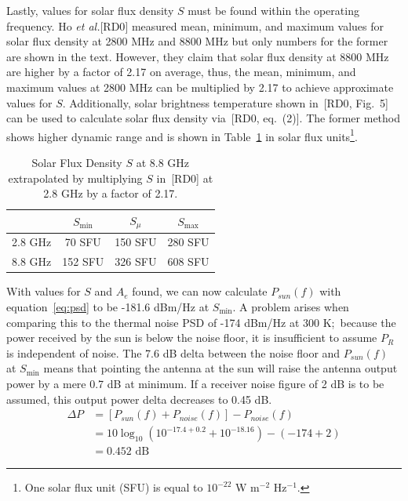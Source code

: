 \documentclass[titlepage]{article}
\newcommand{\nraocite}[1]{[RD0\cite{#1}]}
\newcommand{\nraoprecite}[2][]{[RD0\cite{#2}{, #1}]}
\begin{document}
Lastly, values for solar flux density $S$ must be found within the operating frequency. Ho \textit{et al.}\nraocite{solartemp} measured mean, minimum, and maximum values for solar flux density at 2800 MHz and 8800 MHz but only numbers for the former are shown in the text. However, they claim that solar flux density at 8800 MHz are higher by a factor of 2.17 on average, thus, the mean, minimum, and maximum values at 2800 MHz can be multiplied by 2.17 to achieve approximate values for $S$. Additionally, solar brightness temperature shown in~\nraoprecite[Fig.~5]{solartemp} can be used to calculate solar flux density via~\nraoprecite[eq.~(2)]{solartemp}. The former method shows higher dynamic range and is shown in Table~\ref{tab:sfd} in solar flux units\footnote{One solar flux unit (SFU) is equal to $10^{-22}$ W m$^{-2}$ Hz$^{-1}$.}.
\begin{table}[!ht]
\centering
\begin{tabular}{c|c|c|c}
    & $S_{\min}$ & $S_{\mu}$ & $S_{\max}$ \\ \hline
    2.8 GHz & 70 SFU & 150 SFU & 280 SFU \\
    8.8 GHz & 152 SFU & 326 SFU & 608 SFU
\end{tabular}
\label{tab:sfd}
\caption{Solar Flux Density $S$ at 8.8 GHz extrapolated by multiplying $S$ in~\nraocite{solartemp} at 2.8 GHz by a factor of 2.17.}
\end{table}

With values for $S$ and $A_e$ found, we can now calculate $P_{sun}(f)$ with equation~\ref{eq:psd} to be -181.6 dBm/Hz at $S_{\min}$. A problem arises when comparing this to the thermal noise PSD of -174 dBm/Hz at 300 K;\ because the power received by the sun is below the noise floor, it is insufficient to assume $P_R$ is independent of noise. The 7.6 dB delta between the noise floor and $P_{sun}(f)$ at $S_{\min}$ means that pointing the antenna at the sun will raise the antenna output power by a mere 0.7 dB at minimum. If a receiver noise figure of 2 dB is to be assumed, this output power delta decreases to 0.45 dB.
\begin{align*}
    \Delta P &= [P_{sun}(f)+P_{noise}(f)] - P_{noise}(f)\\
             &= 10 \log_{10} (10^{-17.4+0.2} + 10^{-18.16}) - (-174+2)\\
             &= 0.452 \text{ dB}
\end{align*}
\end{document}
